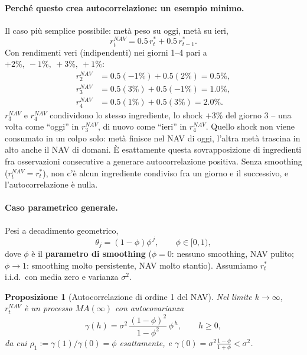 \documentclass[11pt]{article}
\newtheorem{proposition}{Proposizione}
\begin{document}
\paragraph{Perch\'e questo crea autocorrelazione: un esempio minimo.} Il caso pi\`u semplice possibile: met\`a peso su oggi, met\`a su ieri,
\[
r^{NAV}_t = 0.5\, r^\ast_t + 0.5\, r^\ast_{t-1}.
\]
Con rendimenti veri (indipendenti) nei giorni 1--4 pari a $+2\%,\ -1\%,\ +3\%,\ +1\%$:
\begin{align*}
r^{NAV}_2 &= 0.5(-1\%)+0.5(2\%) = 0.5\%, \\
r^{NAV}_3 &= 0.5(3\%)+0.5(-1\%) = 1.0\%, \\
r^{NAV}_4 &= 0.5(1\%)+0.5(3\%) = 2.0\%.
\end{align*}
$r^{NAV}_3$ e $r^{NAV}_4$ condividono lo stesso ingrediente, lo shock $+3\%$ del giorno 3 -- una volta come ``oggi'' in $r^{NAV}_3$, di nuovo come ``ieri'' in $r^{NAV}_4$. Quello shock non viene consumato in un colpo solo: met\`a finisce nel NAV di oggi, l'altra met\`a trascina in alto anche il NAV di domani. \`E esattamente questa sovrapposizione di ingredienti fra osservazioni consecutive a generare autocorrelazione positiva. Senza smoothing ($r^{NAV}_t = r^\ast_t$), non c'\`e alcun ingrediente condiviso fra un giorno e il successivo, e l'autocorrelazione \`e nulla.

\paragraph{Caso parametrico generale.} Pesi a decadimento geometrico,
\[
\theta_j = (1-\phi)\phi^{\,j}, \qquad \phi \in [0,1),
\]
dove $\phi$ \`e il \textbf{parametro di smoothing} ($\phi=0$: nessuno smoothing, NAV pulito; $\phi \to 1$: smoothing molto persistente, NAV molto stantio). Assumiamo $r^\ast_t$ i.i.d.\ con media zero e varianza $\sigma^2$.

\begin{proposition}[Autocorrelazione di ordine 1 del NAV]
\label{prop:rho1}
Nel limite $k\to\infty$, $r^{NAV}_t$ \`e un processo $MA(\infty)$ con autocovarianza
\[
\gamma(h) = \sigma^2\,\frac{(1-\phi)^2}{1-\phi^2}\,\phi^{\,h}, \qquad h\ge 0,
\]
da cui $\rho_1 := \gamma(1)/\gamma(0) = \phi$ \emph{esattamente}, e $\gamma(0) = \sigma^2\frac{1-\phi}{1+\phi} < \sigma^2$.
\end{proposition}
\end{document}
